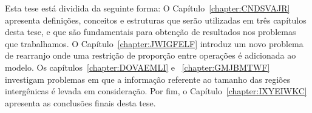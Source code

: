 

Esta tese está dividida da seguinte forma: O Capítulo~\ref{chapter:CNDSVAJR} apresenta definições, conceitos e estruturas que serão utilizadas em três capítulos desta tese, e que são fundamentais para obtenção de resultados nos problemas que trabalhamos. O Capítulo~\ref{chapter:JWIGFELF} introduz um novo problema de rearranjo onde uma restrição de proporção entre operações é adicionada ao modelo. Os capítulos~\ref{chapter:DOVAEMLI} e ~\ref{chapter:GMJBMTWF} investigam problemas em que a informação referente ao tamanho das regiões intergênicas é levada em consideração. Por fim, o Capítulo~\ref{chapter:IXYEIWKC} apresenta as conclusões finais desta tese. 


